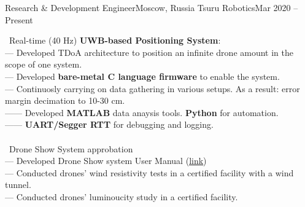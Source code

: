 \resumeSubheading
  {Research \& Development Engineer}{Moscow, Russia}
  {Tsuru Robotics}{Mar 2020 -- Present}
  \begin{itemize}[leftmargin=0in, label={}]
    \small{\item{
      {\textbullet \ Real-time (40 Hz) \textbf{UWB-based Positioning System}:}\\
      {— Developed TDoA architecture to position an infinite drone amount in the scope of one system.}\\
      {— Developed \textbf{bare-metal C language firmware} to enable the system.}\\
      {— Continuosly carrying on data gathering in various setups. As a result: error margin decimation to 10-30 cm.}\\
      {—— Developed \textbf{MATLAB} data anaysis tools. \textbf{Python} for automation.}\\
      {—— \textbf{UART/Segger RTT} for debugging and logging.}\\
      {\ }\\
      {\textbullet \ Drone Show System approbation}\\
      {— Developed Drone Show system User Manual (\href{https://1drv.ms/b/s!ArpOOOargz4JnrknqVsAlp5fFtk6iA}{\underline{link}})}\\
      {— Conducted drones' wind resistivity tests in a certified facility with a wind tunnel.}\\
      {— Conducted drones' luminoucity study in a certified facility.}\\
    }}
  \end{itemize}